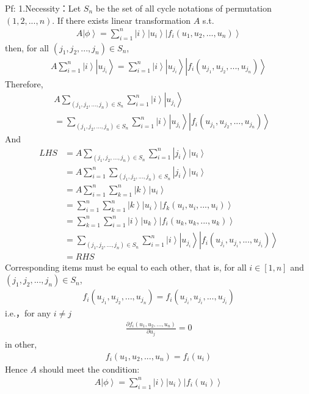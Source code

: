 \documentclass[%
 reprint,
 amsmath,amssymb,
pra,
]{revtex4-1}
\begin{document}
\begin{itemize}
\noindent Pf: 1.Necessity：Let $S_n$ be the set of all cycle notations of permutation $\left(1, 2, ..., n\right)$. If there exists linear transformation $A$ s.t. 
\begin{align*}
	A\left|\phi\right\rangle = \sum_{i=1}^n \left|i\right\rangle\left|u_i\right\rangle\left|f_{i}\left(u_1, u_2, ..., u_n\right)\right\rangle
\end{align*}
then, for all $\left(j_1, j_2, ..., j_n\right)\in S_n$, 
\begin{align*}
	A\sum_{i=1}^n \left|i\right\rangle\left|u_{j_i}\right\rangle = \sum_{i=1}^n \left|i\right\rangle\left|u_{j_i}\right\rangle\left|f_{i}\left(u_{j_1}, u_{j_2}, ..., u_{j_n}\right)\right\rangle
\end{align*}
Therefore,  
\begin{align*}
	&A\sum_{\left(j_1, j_2, ..., j_n\right)\in S_n}\sum_{i=1}^n \left|i\right\rangle\left|u_{j_i}\right\rangle \\
	&=\sum_{\left(j_1, j_2, ..., j_n\right)\in S_n}\sum_{i=1}^n\left|i\right\rangle\left|u_{j_i}\right\rangle\left|f_{i}\left(u_{j_1}, u_{j_2}, ..., u_{j_n}\right)\right\rangle
\end{align*}
And
\begin{align*}
	LHS &= A\sum_{\left(j_1, j_2, ..., j_n\right)\in S_n}\sum_{i=1}^n \left|j_i\right\rangle\left|u_i\right\rangle\\
	&= A\sum_{i=1}^n\sum_{\left(j_1, j_2, ..., j_n\right)\in S_n}\left|j_i\right\rangle\left|u_i\right\rangle\\
	&= A\sum_{i=1}^n\sum_{k=1}^n\left|k\right\rangle\left|u_i\right\rangle \\
	&= \sum_{i=1}^n\sum_{k=1}^n\left|k\right\rangle\left|u_i\right\rangle\left|f_{k}\left(u_i, u_i, ..., u_i\right)\right\rangle\\
	&= \sum_{k=1}^n\sum_{i=1}^n\left|i\right\rangle\left|u_k\right\rangle\left|f_{i}\left(u_k, u_k, ..., u_k\right)\right\rangle \\
	&= \sum_{\left(j_1, j_2, ..., j_n\right)\in S_n}\sum_{i=1}^n\left|i\right\rangle\left|u_{j_i}\right\rangle\left|f_{i}\left(u_{j_i}, u_{j_i}, ..., u_{j_i}\right)\right\rangle\\
	&= RHS
\end{align*}
Corresponding items must be equal to each other, that is, for all $i \in \left[1, n\right]$ and $\left(j_1, j_2, ..., j_n\right)\in S_n$, 
\begin{align*}
	f_{i}\left(u_{j_1}, u_{j_2}, ..., u_{j_n}\right) = f_{i}\left(u_{j_i}, u_{j_i}, ..., u_{j_i}\right)
\end{align*}
i.e.，for any $i\neq j$
\begin{align*}
	\frac{\partial f_i\left(u_1, u_2, ..., u_n\right)}{\partial u_j} = 0
\end{align*}
in other, 
\begin{align*}
	f_i\left(u_1, u_2, ...,u_n\right) = f_i\left(u_i\right)
\end{align*}
Hence $A$ should meet the condition: 
\begin{align*}
	A\left|\phi\right\rangle = \sum_{i=1}^n \left|i\right\rangle\left|u_i\right\rangle\left|f_{i}\left(u_i\right)\right\rangle
\end{align*}


\end{itemize}
\end{document}
